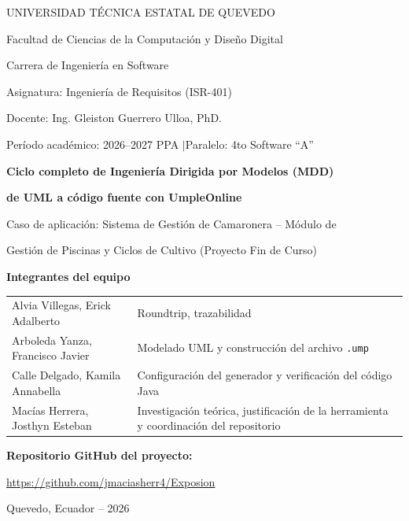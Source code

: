 \documentclass[11pt,a4paper]{article}
\title{\vspace{-2cm}}
\date{}
\begin{document}
\begin{titlepage}
\sloppy
\centering
{\large UNIVERSIDAD T\'ECNICA ESTATAL DE QUEVEDO\par}
{\large Facultad de Ciencias de la Computaci\'on y Dise\~no Digital\par}
{\large Carrera de Ingenier\'ia en Software\par}
\vspace{1.2cm}
{\small Asignatura: Ingenier\'ia de Requisitos (ISR-401)\par}
{\small Docente: Ing. Gleiston Guerrero Ulloa, PhD.\par}
{\small Per\'iodo acad\'emico: 2026--2027 PPA \quad$\vert$\quad Paralelo: 4to Software ``A''\par}
\vspace{1.8cm}
{\Large\bfseries Ciclo completo de Ingenier\'ia Dirigida por Modelos (MDD)\par}
{\Large\bfseries de UML a c\'odigo fuente con UmpleOnline\par}
\vspace{0.4cm}
{\large Caso de aplicaci\'on: Sistema de Gesti\'on de Camaronera -- M\'odulo de\par}
{\large Gesti\'on de Piscinas y Ciclos de Cultivo (Proyecto Fin de Curso)\par}
\vspace{1.6cm}
{\bfseries Integrantes del equipo}\par
\vspace{0.3cm}
\begin{tabular}{@{}p{6.2cm}p{7.2cm}@{}}
Alvia Villegas, Erick Adalberto & Roundtrip, trazabilidad \\[2pt]
Arboleda Yanza, Francisco Javier & Modelado UML y construcci\'on del archivo \texttt{.ump} \\[2pt]
Calle Delgado, Kamila Annabella & Configuraci\'on del generador y verificaci\'on del c\'odigo Java \\[2pt]
Mac\'ias Herrera, Josthyn Esteban & Investigaci\'on te\'orica, justificaci\'on de la herramienta y coordinaci\'on del repositorio \\
\end{tabular}
\vspace{1.8cm}

{\bfseries Repositorio GitHub del proyecto:}\par
\vspace{0.2cm}
\url{https://github.com/jmaciasherr4/Exposion}
\vspace{2.5cm}

\vfill
{\small Quevedo, Ecuador -- 2026\par}
\end{titlepage}
\end{document}
